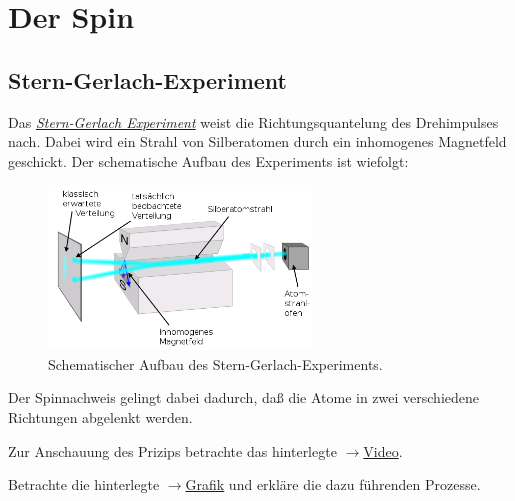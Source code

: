 \documentclass{subfiles}
\begin{document}
    \section{Der Spin}
        \subsection{Stern-Gerlach-Experiment}
            Das \href{https://de.wikipedia.org/wiki/Stern-Gerlach-Versuch}{\emph{Stern-Gerlach Experiment}} weist die Richtungsquantelung des Drehimpulses nach. Dabei wird ein Strahl von Silberatomen durch ein inhomogenes Magnetfeld geschickt. Der schematische Aufbau des Experiments ist wiefolgt:
            \begin{figure}[]
                \centering
                \includegraphics[width=7cm]{Bilddateien/SternGerlach.png}
                \caption{Schematischer Aufbau des Stern-Gerlach-Experiments.}
            \end{figure}
            Der Spinnachweis gelingt dabei dadurch, daß die Atome in zwei verschiedene Richtungen abgelenkt werden. 
            \begin{Aufgabe}
                \nr{} Zur Anschauung des Prizips betrachte das hinterlegte $\to$\href{https://en.wikipedia.org/wiki/File:Quantum_spin_and_the_Stern-Gerlach_experiment.ogv}{Video}.

                \nr{} Betrachte die hinterlegte $\to$\href{https://upload.wikimedia.org/wikipedia/commons/c/cb/Stern-Gerlach_Analyzer_Sequential_Series_E3.png}{Grafik} und erkläre die dazu führenden Prozesse. 
            \end{Aufgabe}
\end{document}
